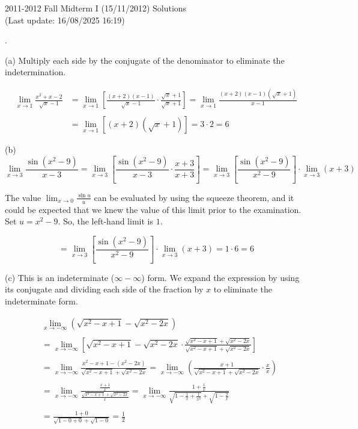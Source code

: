 \documentclass{article}
\begin{document}
\newpage

\begin{center}
2011-2012 Fall Midterm I (15/11/2012) Solutions\\
(Last update: 16/08/2025 16:19)
\end{center}

.

\hfill

\noindent (a) Multiply each side by the conjugate of the denominator to eliminate the indetermination.

\begin{align*}
\lim_{x\to1}\frac{x^2+x-2}{\sqrt x -1}&=\lim_{x\to1}\left[\frac{(x+2)(x-1)}{\sqrt x -1}\cdot \frac{\sqrt x + 1}{\sqrt x +1}\right]=\lim_{x\to1}\frac{(x+2)(x-1)\left(\sqrt x + 1\right)}{x-1}\\\\&=\lim_{x\to1}\left[(x+2)\left(\sqrt x + 1\right)\right] =3\cdot 2 = \boxed6
\end{align*}

\hfill

\noindent (b)
\[\lim_{x\to 3}\frac{\sin(x^2-9)}{x-3}=\lim_{x\to 3}\left[\frac{\sin(x^2-9)}{x-3}\cdot\frac{x+3}{x+3}\right]=\lim_{x\to3}\left[\frac{\sin(x^2-9)}{x^2-9}\right]\cdot\lim_{x\to 3}(x+3)\]

\hfill

\noindent The value $\displaystyle \lim_{x\to0}\frac{\sin u}{u}$ can be evaluated by using the squeeze theorem, and it could be expected that we knew the value of this limit prior to the examination. Set $u=x^2-9$. So, the left-hand limit is $1$.

\[=\lim_{x\to3}\left[\frac{\sin(x^2-9)}{x^2-9}\right]\cdot\lim_{x\to 3}(x+3) = 1\cdot 6 = \boxed6\]

\hfill

\noindent (c) This is an indeterminate ($\infty - \infty$) form. We expand the expression by using its conjugate and dividing each side of the fraction by $x$ to eliminate the indeterminate form.

\begin{align*}&\lim_{x\to -\infty}\left(\sqrt{x^2-x+1}-\sqrt{x^2-2x}\right)\\\\&=\lim_{x\to -\infty}\left[\sqrt{x^2-x+1}-\sqrt{x^2-2x}\cdot\frac{\sqrt{x^2-x+1}+\sqrt{x^2-2x}}{\sqrt{x^2-x+1}+\sqrt{x^2-2x}}\right]\\\\&=\lim_{x\to-\infty}\frac{x^2-x+1-\left(x^2-2x\right)}{\sqrt{x^2-x+1}+\sqrt{x^2-2x}}=\lim_{x\to-\infty}\left(\frac{x+1}{\sqrt{x^2-x+1}+\sqrt{x^2-2x}}\cdot\frac{x}{x}\right)\\\\&=\lim_{x\to-\infty}\frac{\displaystyle\frac{x+1}x}{\displaystyle \frac{\sqrt{x^2-x+1}+\sqrt{x^2-2x}}x}=\lim_{x\to-\infty}\frac{\displaystyle1+\frac{1}x}{\displaystyle\sqrt{1-\frac1x+\frac1{x^2}}+\sqrt{1-\frac2x}}\\\\&=\frac{1+0}{\sqrt{1-0+0}+\sqrt{1-0}}=\boxed{\frac12}\end{align*}
\end{document}
